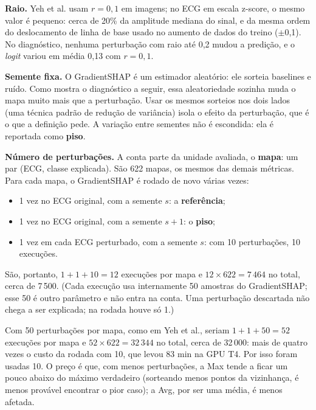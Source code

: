 \documentclass[11pt,a4paper]{article}
\begin{document}
\textbf{Raio.} Yeh et al. usam $r = 0{,}1$ em imagens; no ECG em escala z-score, o mesmo valor é pequeno: cerca de 20\% da amplitude mediana do sinal, e da mesma ordem do deslocamento de linha de base usado no aumento de dados do treino ($\pm$0,1). No diagnóstico, nenhuma perturbação com raio até 0,2 mudou a predição, e o \textit{logit} variou em média 0,13 com $r = 0{,}1$.

\textbf{Semente fixa.} O GradientSHAP é um estimador aleatório: ele sorteia baselines e ruído. Como mostra o diagnóstico a seguir, essa aleatoriedade sozinha muda o mapa muito mais que a perturbação. Usar os mesmos sorteios nos dois lados (uma técnica padrão de redução de variância) isola o efeito da perturbação, que é o que a definição pede. A variação entre sementes não é escondida: ela é reportada como \textbf{piso}.

\textbf{Número de perturbações.} A conta parte da unidade avaliada, o \textbf{mapa}: um par (ECG, classe explicada). São 622 mapas, os mesmos das demais métricas. Para cada mapa, o GradientSHAP é rodado de novo várias vezes:
\begin{itemize}
\item 1 vez no ECG original, com a semente $s$: a \textbf{referência};
\item 1 vez no ECG original, com a semente $s+1$: o \textbf{piso};
\item 1 vez em cada ECG perturbado, com a semente $s$: com 10 perturbações, 10 execuções.
\end{itemize}
São, portanto, $1 + 1 + 10 = 12$ execuções por mapa e $12 \times 622 = 7\,464$ no total, cerca de 7\,500. (Cada execução usa internamente 50 amostras do GradientSHAP; esse 50 é outro parâmetro e não entra na conta. Uma perturbação descartada não chega a ser explicada; na rodada houve só 1.)

Com 50 perturbações por mapa, como em Yeh et al., seriam $1 + 1 + 50 = 52$ execuções por mapa e $52 \times 622 = 32\,344$ no total, cerca de 32\,000: mais de quatro vezes o custo da rodada com 10, que levou 83 min na GPU T4. Por isso foram usadas 10. O preço é que, com menos perturbações, a Max tende a ficar um pouco abaixo do máximo verdadeiro (sorteando menos pontos da vizinhança, é menos provável encontrar o pior caso); a Avg, por ser uma média, é menos afetada.
\end{document}
